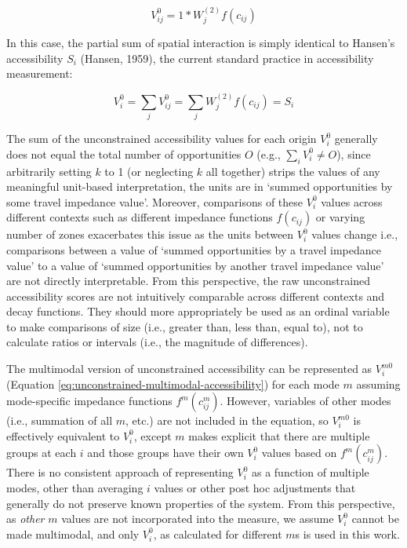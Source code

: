 \documentclass[
11pt, %
oneside, %
english, %
singlespacing, %
]{macthesis} %
\begin{document}
\begin{equation}
\label{eq:unconstrained-access}
V^0_{ij} = 1 *W_j^{(2)} f(c_{ij})
\end{equation} 

In this case, the partial sum of spatial interaction is simply identical to Hansen's accessibility \(S_i\) (Hansen, 1959), the current standard practice in accessibility measurement:

\begin{equation}
\label{eq:unconstrained-accessibility}
V^0_i = \sum_j V^0_{ij} = \sum_j W^{(2)}_jf(c_{ij}) = S_i
\end{equation} 

The sum of the unconstrained accessibility values for each origin \(V^0_{i}\) generally does not equal the total number of opportunities \(O\) (e.g., \(\sum_i V^0_{i} \not= O\)), since arbitrarily setting \(k\) to 1 (or neglecting \(k\) all together) strips the values of any meaningful unit-based interpretation, the units are in `summed opportunities by some travel impedance value'. Moreover, comparisons of these \(V^0_{i}\) values across different contexts such as different impedance functions \(f(c_{ij})\) or varying number of zones exacerbates this issue as the units between \(V^0_{i}\) values change i.e., comparisons between a value of `summed opportunities by a travel impedance value' to a value of `summed opportunities by another travel impedance value' are not directly interpretable. From this perspective, the raw unconstrained accessibility scores are not intuitively comparable across different contexts and decay functions. They should more appropriately be used as an ordinal variable to make comparisons of size (i.e., greater than, less than, equal to), not to calculate ratios or intervals (i.e., the magnitude of differences).

The multimodal version of unconstrained accessibility can be represented as \(V^{m0}_{i}\) (Equation \ref{eq:unconstrained-multimodal-accessibility}) for each mode \(m\) assuming mode-specific impedance functions \(f^m(c^m_{ij})\). However, variables of other modes (i.e., summation of all \(m\), etc.) are not included in the equation, so \(V^{m0}_{i}\) is effectively equivalent to \(V^0_{i}\), except \(m\) makes explicit that there are multiple groups at each \(i\) and those groups have their own \(V^0_i\) values based on \(f^m(c^m_{ij})\). There is no consistent approach of representing \(V^0_{i}\) as a function of multiple modes, other than averaging \(i\) values or other post hoc adjustments that generally do not preserve known properties of the system. From this perspective, as \emph{other} \(m\) values are not incorporated into the measure, we assume \(V^0_{i}\) cannot be made multimodal, and only \(V^0_{i}\), as calculated for different \(m\)s is used in this work.
\end{document}
